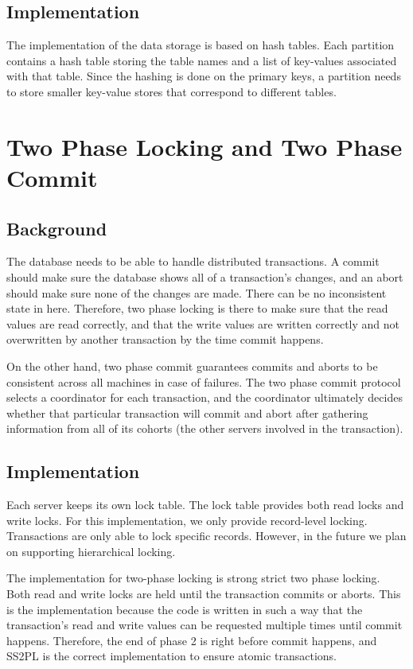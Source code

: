 \documentclass[a4paper, 10pt, notitlepage]{article}
\begin{document}
\subsection{Implementation}
The implementation of the data storage is based on hash tables. Each partition contains a hash table storing the table names and a list
of key-values associated with that table. Since the hashing is done on the primary keys, a partition needs to store smaller key-value
stores that correspond to different tables. 

\section{Two Phase Locking and Two Phase Commit}

\subsection{Background}
The database needs to be able to handle distributed transactions. A commit should make sure the database shows all of a transaction's
changes, and an abort should make sure none of the changes are made. There can be no inconsistent state in here. Therefore, two phase
locking is there to make sure that the read values are read correctly, and that the write values are written correctly and not
overwritten by another transaction by the time commit happens.

On the other hand, two phase commit guarantees commits and aborts to be consistent across all machines in case of failures. The 
two phase commit protocol selects a coordinator for each transaction, and the coordinator ultimately decides whether that particular
transaction will commit and abort after gathering information from all of its cohorts (the other servers involved in the transaction).

\subsection{Implementation}

Each server keeps its own lock table. The lock table provides both read locks and write locks. For this implementation, we only provide
record-level locking. Transactions are only able to lock specific records. However, in the future we plan on supporting hierarchical
locking. 

The implementation for two-phase locking is strong strict two phase locking. Both read and write locks are held until the transaction
commits or aborts. This is the implementation because the code is written in such a way that the transaction's read and write values
can be requested multiple times until commit happens. Therefore, the end of phase 2 is right before commit happens, and SS2PL is the
correct implementation to ensure atomic transactions.
\end{document}
